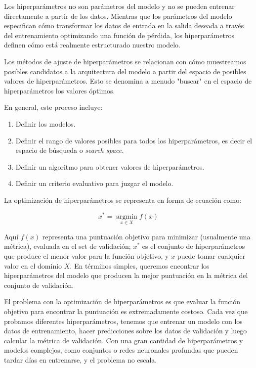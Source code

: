 \documentclass[a4paper,12pt]{article}
\begin{document}
Los hiperparámetros no son parámetros del modelo y no se pueden entrenar directamente a partir de los datos. Mientras que los parámetros del modelo especifican cómo transformar los datos de entrada en la salida deseada a través del entrenamiento optimizando una función de pérdida, los hiperparámetros definen cómo está realmente estructurado nuestro modelo.

Los métodos de ajuste de hiperparámetros se relacionan con cómo muestreamos posibles candidatos a la arquitectura del modelo a partir del espacio de posibles valores de hiperparámetros. Esto se denomina a menudo "buscar" en el espacio de hiperparámetros los valores óptimos.

En general, este proceso incluye:

\begin{enumerate}
	\item Definir los modelos.
	\item Definir el rango de valores posibles para todos los hiperparámetros, es decir el espacio de búsqueda o \textit{search space}.
	\item Definir un algoritmo para obtener valores de hiperparámetros.
	\item Definir un criterio evaluativo para juzgar el modelo.
\end{enumerate}

La optimización de hiperparámetros se representa en forma de ecuación como:

$$x^* = \operatorname*{argmin}_{x \in X} f(x)$$

Aquí $f(x)$ representa una puntuación objetivo para minimizar (usualmente una métrica), evaluada en el set de validación; $x^*$ es el conjunto de hiperparámetros que produce el menor valor para la función objetivo, y $x$ puede tomar cualquier valor en el dominio $X$. En términos simples, queremos encontrar los hiperparámetros del modelo que producen la mejor puntuación en la métrica del conjunto de validación.

El problema con la optimización de hiperparámetros es que evaluar la función objetivo para encontrar la puntuación es extremadamente costoso. Cada vez que probamos diferentes hiperparámetros, tenemos que entrenar un modelo con los datos de entrenamiento, hacer predicciones sobre los datos de validación y luego calcular la métrica de validación. Con una gran cantidad de hiperparámetros y modelos complejos, como conjuntos o redes neuronales profundas que pueden tardar días en entrenarse, y el problema no escala.
\end{document}
